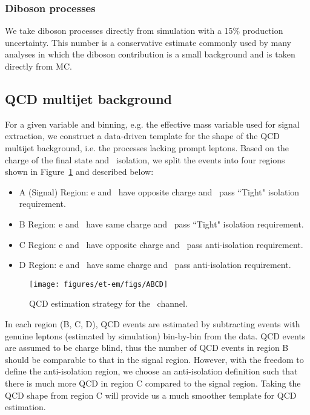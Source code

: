 \subsubsection{Diboson processes}
We take diboson processes directly from simulation with a 15\% production uncertainty. This number is a conservative estimate commonly used by many analyses in which the diboson contribution is a small background and is taken directly from MC.

    
\subsection{QCD multijet background}\label{sec:etau_qcd}
For a given variable and binning, e.g. the effective mass variable
used for signal extraction, we construct a data-driven template for
the shape of the QCD multijet background, i.e. the processes lacking
prompt leptons.  Based on the charge of the final state and \tauh ~isolation,
we split the events into four regions shown in Figure~\ref{fig:ABCD} and 
described below:
\begin{itemize}
  \item A (Signal) Region: e and \tauh ~have opposite charge and \tauh ~pass ``Tight" isolation requirement.
  \item B Region: e and \tauh ~have same charge and \tauh ~pass ``Tight" isolation requirement.
  \item C Region: e and \tauh ~have opposite charge and \tauh ~pass anti-isolation requirement.
  \item D Region: e and \tauh ~have same charge and \tauh ~pass anti-isolation requirement.
\end{itemize}

\begin{figure}[thbp!]\centering
  \texttt{[image: figures/et-em/figs/ABCD]}
  \caption{\label{fig:ABCD} QCD estimation strategy for the \teth ~channel.}
\end{figure}
In each region (B, C, D), QCD events are estimated by subtracting events
with genuine leptons (estimated by simulation) bin-by-bin from the data.
QCD events are assumed to be charge blind, thus the number of QCD events in region B should be 
comparable to that in the signal region. However, with the freedom to define the
anti-isolation region, we choose an anti-isolation definition such
that there is much more QCD in region C compared to the signal region. 
Taking the QCD shape from region C will provide us 
a much smoother template for QCD estimation.

